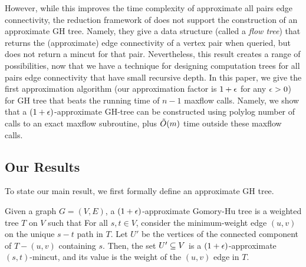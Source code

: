 However, while this improves the time complexity of approximate all pairs edge connectivity, the reduction framework of \cite{AbboudKT20b} does not support the construction of an approximate GH tree. Namely, they give a data structure (called a {\em flow tree}) that returns the (approximate) edge connectivity of a vertex pair when queried, but does not return a mincut for that pair. Nevertheless, this result creates a range of possibilities, now that we have a technique for designing computation trees for all pairs edge connectivity that have small recursive depth. In this paper, we give the first approximation algorithm (our approximation factor is $1+\epsilon$ for any $\epsilon>0$) for GH tree that beats the running time of $n-1$ maxflow calls. Namely, we show that a $(1+\epsilon)$-approximate GH-tree can be constructed using polylog number of calls to an exact maxflow subroutine, plus $\tilde{O}(m)$ time outside these maxflow calls.

\subsection{Our Results}


To state our main result, we first formally define an approximate GH tree. 

Given a graph $G=(V,E)$, a $(1+\epsilon)$-approximate Gomory-Hu tree is a weighted tree $T$ on $V$ such that
 \BI
 \im For all $s,t\in V$, consider the minimum-weight edge $(u,v)$ on the unique $s-t$ path in $T$. Let $U'$ be the vertices of the connected component of $T-(u,v)$ containing $s$.
Then, the set $U'\subseteq V$ is a $(1+\epsilon)$-approximate $(s,t)$-mincut, and its value is the weight of the $(u, v)$ edge in $T$.
 \EI
\ED

